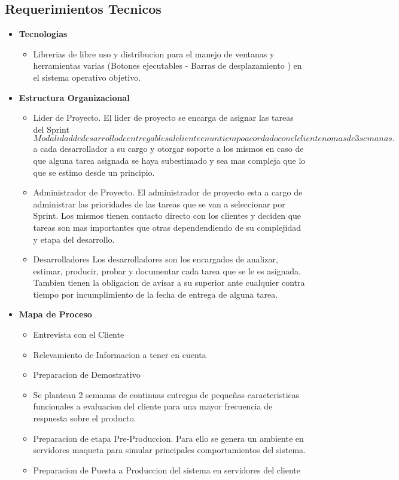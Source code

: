 \documentclass[
10pt, %
a4paper, %
oneside, %
headinclude,footinclude, %
BCOR5mm, %
]{scrartcl}
\begin{document}
\subsection{Requerimientos Tecnicos}
\begin{itemize}
  \item \textbf {Tecnologias}
  \begin{itemize}
    \item Librerias de libre uso y distribucion para el manejo de ventanas
          y herramientas varias (Botones ejecutables - Barras de desplazamiento )
          en el sistema operativo objetivo.
  \end{itemize}

  \item \textbf {Estructura Organizacional}
  \begin{itemize}
    \item Lider de Proyecto.
            El lider de proyecto se encarga de asignar las tareas del
            Sprint \(Modalidad de desarrollo de entregables al cliente en un
                     tiempo acordado con el cliente no mas de 3 semanas. \)
            a cada desarrollador a su cargo y otorgar soporte a los mismos
            en caso de que alguna tarea asignada se haya subestimado y sea
            mas compleja que lo que se estimo desde un principio.
    \item Administrador de Proyecto.
            El administrador de proyecto esta a cargo de administrar las
            prioridades de las tareas que se van a seleccionar por Sprint.
            Los mismos tienen contacto directo con los clientes y deciden
            que tareas son mas importantes que otras dependendiendo de su
            complejidad y etapa del desarrollo.
    \item Desarrolladores
            Los desarrolladores son los encargados de analizar, estimar,
            producir, probar y documentar cada tarea que se le es asignada.
            Tambien tienen la obligacion de avisar a su superior ante cualquier
            contra tiempo por incumplimiento de la fecha de entrega de alguna tarea.
  \end{itemize}

  \item \textbf {Mapa de Proceso}
  \begin{itemize}
    \item Entrevista con el Cliente
    \item Relevamiento de Informacion a tener en cuenta
    \item Preparacion de Demostrativo
    \item Se plantean 2 semanas de continuas entregas de
            pequeñas caracteristicas funcionales a evaluacion
            del cliente para una mayor frecuencia de respuesta
            sobre el producto.

    \item Preparacion de etapa Pre-Produccion. Para ello se genera un ambiente
            en servidores maqueta para simular principales
            comportamientos del sistema.

    \item Preparacion de Puesta a Produccion del sistema en servidores del cliente
  \end{itemize}
\end{itemize}
\end{document}
